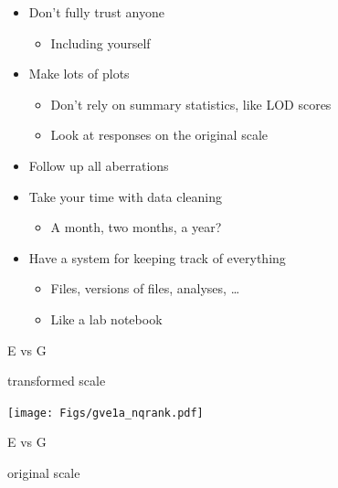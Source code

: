 \documentclass[12pt]{article}
\newcommand{\headsize}{\fontsize{35}{35} \selectfont}
\newcommand{\smallersize}{\fontsize{20}{25} \selectfont}
\newcommand{\smallestsize}{\fontsize{18}{22} \selectfont}
\begin{document}
\hfill \begin{minipage}{10in}

\begin{itemize}
\itemsep24pt

\item Don't fully trust anyone
{\smallestsize \color{myblue}
\begin{itemize}
\item Including yourself
\end{itemize} }

\item Make lots of plots
{\smallestsize \color{myblue}
\begin{itemize}
\item Don't rely on summary statistics, like LOD scores
\item Look at responses on the original scale
\end{itemize} }

\item Follow up all aberrations

\item Take your time with data cleaning
{\smallestsize \color{myblue}
\begin{itemize}
\item A month, two months, a year?
\end{itemize} }

\item Have a system for keeping track of everything
{\smallestsize \color{myblue}
\begin{itemize}
\item Files, versions of files, analyses, \dots
\item Like a lab notebook
\end{itemize} }



\end{itemize}
\end{minipage}


\newpage

\headsize \color{myyellow}
\hfill \begin{minipage}{5.75in}
\centering
E vs G

{\smallersize \color{mywhite} transformed scale}
\end{minipage}

\vfill

\centerline{\texttt{[image: Figs/gve1a\_nqrank.pdf]}}

\newpage

\headsize \color{myyellow}
\hfill \begin{minipage}{5.75in}
\centering
E vs G

{\smallersize \color{mywhite} original scale}
\end{minipage}
\end{document}
